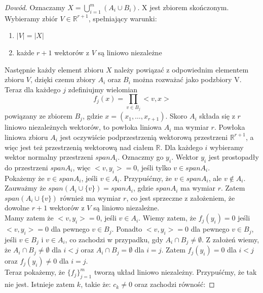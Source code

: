 \documentclass[12pt,a4paper]{article}
\begin{document}
\begin{proof}[Dow\'od]
Oznaczamy $X=\bigcup_{i=1}^{m} (A_i \cup B_{i})$. X jest zbiorem sko\'nczonym. Wybieramy zbi\'or $V\in\mathbb{R}^{r+1}$, spe{\l}niaj\k{a}cy warunki: 
\begin{enumerate}[1)]
\item $|V|=|X|$ 
\item ka\.zde $r+1$ wektor\'ow z $V$ s\k{a} liniowo niezale\.zne
\end{enumerate}
 Nast\k{e}pnie ka\.zdy element zbioru $X$ nale\.zy powi\k{a}za\'c z odpowiednim elementem zbioru $V$, dzi\k{e}ki czemu zbiory $A_{i}$ oraz $B_{i}$ mo\.zna rozwa\.za\'c jako podzbiory V. Teraz dla ka\.zdego $j$ zdefiniujmy wielomian 
\begin{equation}
f_{j}(x)=\prod_{v\in B_{j}}<v,x> 
\end{equation}
 powi\k{a}zany ze zbiorem $B_{j}$, gdzie $x=(x_{1},\ldots,x_{r+1})$. Skoro $A_{i}$ sk{\l}ada si\k{e} z $r$ liniowo niezale\.znych wektor\'ow, to pow{\l}oka liniowa $A_{i}$ ma wymiar $r$. Pow{\l}oka liniowa zbioru $A_{i}$ jest oczywi\'scie podprzestrzeni\k{a} wektorow\k{a} przestrzeni $\mathbb{R}^{r+1}$, a wi\k{e}c jest te\.z przestrzeni\k{a} wektorow\k{a} nad cia{\l}em $\mathbb{R}$.  Dla ka\.zdego $i$ wybieramy wektor normalny przestrzeni $spanA_{i}$. Oznaczmy go $y_{i}$. Wektor $y_{i}$ jest prostopad{\l}y do przestrzeni $spanA_{i}$, wi\k{e}c $<v,y_{i}>=0$, je\'sli tylko $v\in spanA_{i}$.\\ 
Poka\.zemy \.ze $v\in spanA_{i}$, je\'sli $v\in A_{i}$. Przypu\'s\'cmy, \.ze $v\in spanA_{i}$, ale $v\notin A_{i}$. Zauwa\.zmy \.ze $span(A_{i}\cup\{v\})=spanA_{i}$, gdzie $spanA_{i}$ ma wymiar $r$. Zatem $span(A_{i}\cup\{v\})$ r\'ownie\.z ma wymiar $r$, co jest sprzeczne z za{\l}o\.zeniem, \.ze dowolne $r+1$ wektor\'ow z $V$ s\k{a} liniowo niezale\.zne. \\
Mamy zatem \.ze $<v,y_{i}>=0$, je\'sli $v\in A_{i}$. Wiemy zatem, \.ze $f_j(y_{i})=0$ je\'sli $<v,y_{i}>=0$ dla pewnego $v\in B_{j}$. Ponadto $<v,y_{i}>=0$ dla pewnego $v\in B_{j}$, je\'sli $v\in B_{j}$ i $v\in A_{i}$, co zachodzi w przypadku, gdy $A_{i}\cap B_{j}\neq\emptyset$. Z za{\l}o\.ze\'n wiemy, \.ze $A_{i}\cap B_{j}\neq\emptyset$ dla $i<j$ oraz $A_{i}\cap B_{j}=\emptyset$ dla $i=j$. Zatem $f_{j}(y_{i})=0$ dla $i<j$ oraz $f_{j}(y_{i})\neq0$ dla $i=j$. \\
Teraz poka\.zemy, \.ze $\{f_{j}\}_{j=1}^{m}$ tworz\k{a} uk{\l}ad liniowo niezale\.zny. Przypu\'s\'cmy, \.ze tak nie jest. Istnieje zatem $k$, takie \.ze: $c_{k}\neq0$ oraz zachodzi r\'owno\'s\'c: 

\end{proof}
\end{document}
